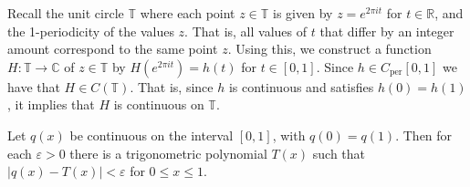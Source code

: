 \documentclass[../thesis.tex]{subfiles}
\begin{document}
Recall the unit circle $\mathbb{T}$ where each point $z \in \mathbb{T}$ is given by $z= e^{2\pi i t}$ for $t \in \mathbb{R}$, and the 1-periodicity of the values $z$.  That is, all values of $t$ that differ by an integer amount correspond to the same point $z$. Using this, we construct a function $H: \mathbb{T} \longrightarrow \mathbb{C}$ of  $z\in\mathbb{T}$ by $H(e^{2 \pi i t})=h(t)$ for $t\in[0,1]$. Since $h \in C_{\text{per}}[0,1]$ we have that $H \in C(\mathbb{T})$. That is, since $h$ is continuous and satisfies $h(0) = h(1)$, it implies that $H$ is continuous on $\mathbb{T}$.
\begin{theorem}
    Let $q(x)$ be continuous on the interval $[0, 1]$, with $q(0)=q(1)$. Then for each $\varepsilon>0$ there is a trigonometric polynomial $T(x)$ such that $|q(x)-T(x)|<\varepsilon$ for $0 \leq x \leq 1$.
\end{theorem}
\end{document}
